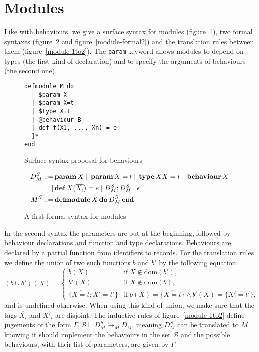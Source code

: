 \documentclass[a4paper,10pt]{article}
\newcommand{\kw}[1]{%
  \,\text{\textbf{#1}}\,
}
\newcommand{\pipe}{%
\; | \;
}
\begin{document}
\section{Modules}
Like with behaviours, we give a surface syntax for modules
(figure~\ref{module-surface}), two formal syntaxes (figure~\ref{module-formal1}
and figure~\ref{module-formal2}) and the translation rules between them
(figure~\ref{module-1to2}). The \texttt{param} keyword allows modules to depend
on types (the first kind of declaration) and to specify the arguments of
behaviours (the second one).
\begin{figure}[h]
\begin{verbatim}
defmodule M do
  [ $param X
  | $param X=t
  | $type X=t
  | @behaviour B
  | def f(X1, ..., Xn) = e
  ]*
end
\end{verbatim}
\caption{Surface syntax proposal for behaviours}\label{module-surface}
\end{figure}
\begin{figure}[h]
  \begin{align*}
    D_M^S ::=& \kw{param} X \pipe \kw{param} X = t
    \pipe \kw{type} X \overline{X} = t \pipe \kw{behaviour} X \\
    |& \kw{def} X(\overline{X,}) = e \pipe D_M^S; D_M^S \pipe \epsilon \\
    M^S ::=& \kw{defmodule} X \kw{do} D_M^S \kw{end}
  \end{align*}
  \caption{A first formal syntax for modules}\label{module-formal1}
\end{figure}

In the second syntax the parameters are put at the beginning, followed by
behaviour declarations and function and type declarations. Behaviours are
declared by a partial function from identifiers to records. For the translation
rules we define the union of two such functions $b$ and $b'$ by the following
equation:
\[
(b \cup b')(X) = \begin{cases} b(X) & \text{if } X  \notin \text{dom}(b'),\\
  b'(X) & \text{if } X  \notin \text{dom}(b),\\
  \{\overline{X=t};\overline{X'=t'}\}& \text{if }
  b(X)=\{\overline{X=t}\} \wedge b'(X)=\{\overline{X'=t'}\},
\end{cases}
\]
and is undefined otherwise. When using this kind of union, we make sure that the
tags $\overline{X_i}$ and $\overline{X'_i}$ are disjoint. The inductive rules of
figure~\ref{module-1to2} define jugements of the form $\Gamma,\mathcal{B}\vdash
D_M^S\hookrightarrow_M D_M$, meaning $D_M^S$ can be translated to $M$ knowing it
should implement the behaviours in the set $\mathcal{B}$ and the possible
behaviours, with their list of parameters, are given by $\Gamma$.
\end{document}
